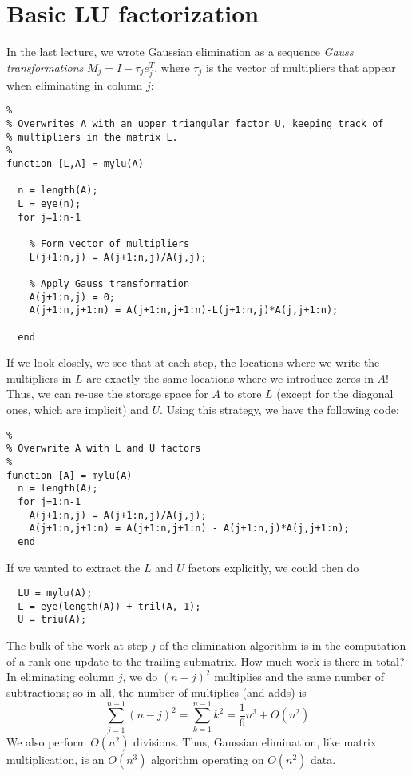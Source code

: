 \documentclass[12pt, leqno]{article}
\begin{document}

\section{Basic LU factorization}

In the last lecture, we wrote Gaussian elimination as a sequence
{\em Gauss transformations} $M_j = I - \tau_j e_j^T$, where $\tau_j$ is
the vector of multipliers that appear when eliminating in column $j$:
\begin{lstlisting}
%
% Overwrites A with an upper triangular factor U, keeping track of
% multipliers in the matrix L.
%
function [L,A] = mylu(A)

  n = length(A);
  L = eye(n);
  for j=1:n-1

    % Form vector of multipliers
    L(j+1:n,j) = A(j+1:n,j)/A(j,j);

    % Apply Gauss transformation
    A(j+1:n,j) = 0;
    A(j+1:n,j+1:n) = A(j+1:n,j+1:n)-L(j+1:n,j)*A(j,j+1:n);

  end
\end{lstlisting}

If we look closely, we see that at each step, the locations where we
write the multipliers in $L$ are exactly the same locations where we
introduce zeros in $A$!  Thus, we can re-use the storage space for $A$
to store $L$ (except for the diagonal ones, which are implicit) and
$U$.  Using this strategy, we have the following code:
\begin{lstlisting}
%
% Overwrite A with L and U factors
%
function [A] = mylu(A)
  n = length(A);
  for j=1:n-1
    A(j+1:n,j) = A(j+1:n,j)/A(j,j);
    A(j+1:n,j+1:n) = A(j+1:n,j+1:n) - A(j+1:n,j)*A(j,j+1:n);
  end
\end{lstlisting}
If we wanted to extract the $L$ and $U$ factors explicitly, we could
then do
\begin{lstlisting}
  LU = mylu(A);
  L = eye(length(A)) + tril(A,-1);
  U = triu(A);
\end{lstlisting}

The bulk of the work at step $j$ of the elimination algorithm is in
the computation of a rank-one update to the trailing submatrix.
How much work is there in total?  In eliminating column $j$, we do
$(n-j)^2$ multiplies and the same number of subtractions; so in all,
the number of multiplies (and adds) is
\[
  \sum_{j=1}^{n-1} (n-j)^2 = \sum_{k=1}^{n-1} k^2 = \frac{1}{6} n^3 + O(n^2)
\]
We also perform $O(n^2)$ divisions.  Thus, Gaussian elimination, like
matrix multiplication, is an $O(n^3)$ algorithm operating on $O(n^2)$ data.
\end{document}
